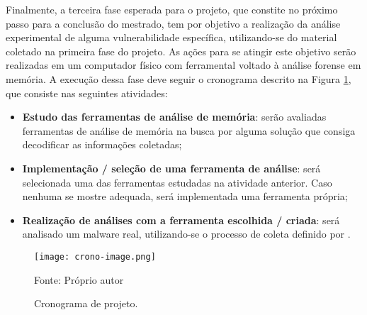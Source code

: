 Finalmente, a terceira fase esperada para o projeto, que constite no próximo passo para a conclusão do mestrado, tem por objetivo a realização da análise experimental de alguma vulnerabilidade específica, utilizando-se do material coletado na primeira fase do projeto.
%
As ações para se atingir este objetivo serão realizadas em um computador físico com ferramental voltado à análise forense em memória.
%
A execução dessa fase deve seguir o cronograma descrito na Figura \ref{fig:cronograma}, que consiste nas seguintes atividades:


\begin{itemize}
 \item \textbf{Estudo das ferramentas de análise de memória}: serão avaliadas ferramentas de análise de memória na busca por alguma solução que consiga decodificar as informações coletadas;
 \item \textbf{Implementação / seleção de uma ferramenta de análise}: será selecionada uma das ferramentas estudadas na atividade anterior. Caso nenhuma se mostre adequada, será implementada uma ferramenta própria;
 \item \textbf{Realização de análises com a ferramenta escolhida / criada}: será analisado um malware real, utilizando-se o processo de coleta definido por \fancyname.
\end{itemize}

\begin{figure}[htb!]
\footnotesize
\caption{Cronograma de projeto.} %
\texttt{[image: crono-image.png]}
\centering
\label{fig:cronograma}
\begin{center}
Fonte: Próprio autor 
\end{center}
\end{figure}

%

